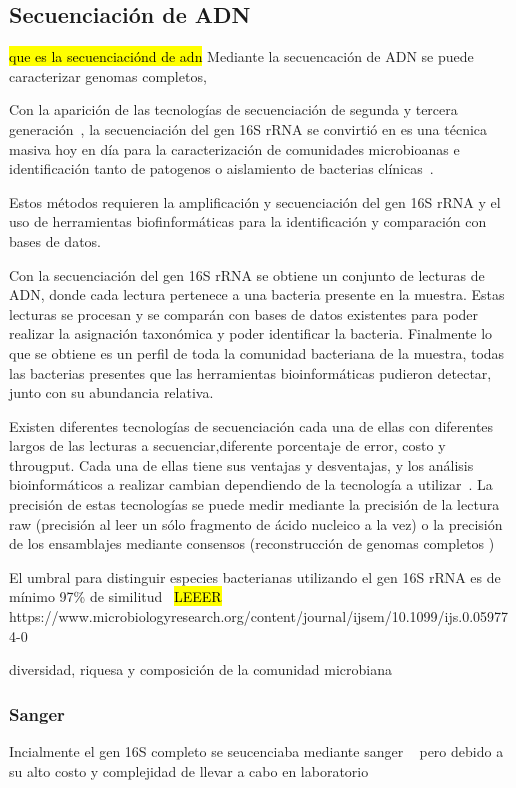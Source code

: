 \subsection{Secuenciación de ADN}

\hl{que es la secuenciaciónd de adn}
Mediante la secuencación de ADN se puede caracterizar genomas completos, 


Con la aparición de las tecnologías de secuenciación de segunda y tercera generación~\cite{janda200716s,pollock2018madness}, la secuenciación del gen 16S rRNA se convirtió en es una técnica masiva hoy en día para la caracterización de comunidades microbioanas e identificación tanto de patogenos o aislamiento de bacterias clínicas~\cite{patel200116s}.

Estos métodos requieren la amplificación y secuenciación del gen 16S rRNA y el uso de herramientas biofinformáticas para la identificación y comparación con bases de datos.

Con la secuenciación del gen 16S rRNA se obtiene un conjunto de lecturas de ADN, donde cada lectura pertenece a una bacteria presente en la muestra. Estas lecturas se procesan y se comparán con bases de datos existentes para poder realizar la asignación taxonómica y poder identificar la bacteria. Finalmente lo que se obtiene es un perfil de toda la comunidad bacteriana de la muestra, todas las bacterias presentes que las herramientas bioinformáticas pudieron detectar, junto con su abundancia relativa.

Existen diferentes tecnologías de secuenciación cada una de ellas con diferentes largos de las lecturas a secuenciar,diferente porcentaje de error, costo y througput. Cada una de ellas tiene sus ventajas y desventajas, y los análisis bioinformáticos a realizar cambian dependiendo de la tecnología a utilizar~\cite{bierman2014understanding}.
La precisión de estas tecnologías se puede medir mediante la precisión de la lectura raw (precisión al leer un sólo fragmento de ácido nucleico a la vez) o la precisión de los ensamblajes mediante consensos (reconstrucción de genomas completos ) 

El umbral para distinguir especies bacterianas utilizando el gen 16S rRNA es de mínimo 97\% de similitud~\cite{kim2014towards}
\hl{LEEER} https://www.microbiologyresearch.org/content/journal/ijsem/10.1099/ijs.0.059774-0


diversidad, riquesa y composición de la comunidad microbiana
\subsubsection{Sanger}
Incialmente el gen 16S completo se seucenciaba mediante sanger ~\cite{sanger1975rapid} pero debido a su alto costo y complejidad de llevar a cabo en laboratorio
